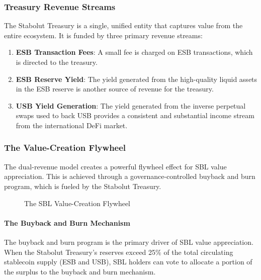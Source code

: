 \subsubsection{Treasury Revenue Streams}
The Stabolut Treasury is a single, unified entity that captures value from the entire ecosystem. It is funded by three primary revenue streams:
\begin{enumerate}
    \item \textbf{ESB Transaction Fees}: A small fee is charged on ESB transactions, which is directed to the treasury.
    \item \textbf{ESB Reserve Yield}: The yield generated from the high-quality liquid assets in the ESB reserve is another source of revenue for the treasury.
    \item \textbf{USB Yield Generation}: The yield generated from the inverse perpetual swaps used to back USB provides a consistent and substantial income stream from the international DeFi market.
\end{enumerate}

\subsubsection{The Value-Creation Flywheel}
The dual-revenue model creates a powerful flywheel effect for SBL value appreciation. This is achieved through a governance-controlled buyback and burn program, which is fueled by the Stabolut Treasury.

\begin{figure}[h!]
\centering
{}
\caption{The SBL Value-Creation Flywheel}
\label{fig:flywheel}
\end{figure}

\paragraph{The Buyback and Burn Mechanism}
The buyback and burn program is the primary driver of SBL value appreciation. When the Stabolut Treasury's reserves exceed 25\% of the total circulating stablecoin supply (ESB and USB), SBL holders can vote to allocate a portion of the surplus to the buyback and burn mechanism.

